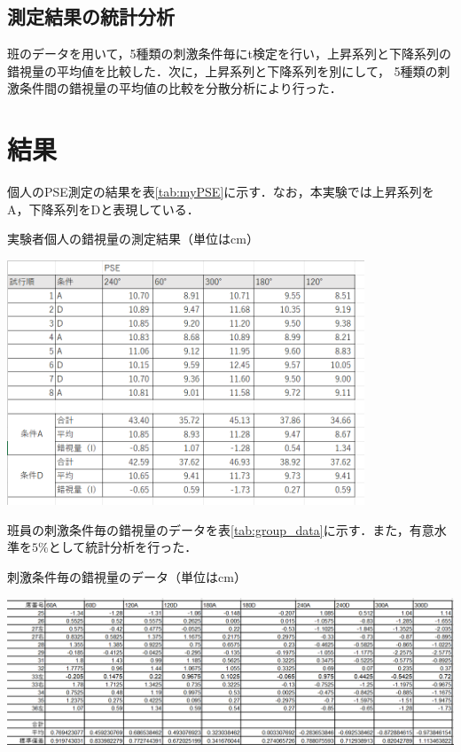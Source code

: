 \documentclass{jlreq}
\numberwithin{equation}{section}
\begin{document}
\subsection{測定結果の統計分析}
班のデータを用いて，5種類の刺激条件毎にt検定を行い，上昇系列と下降系列の錯視量の平均値を比較した．次に，上昇系列と下降系列を別にして，
5種類の刺激条件間の錯視量の平均値の比較を分散分析により行った．

\section{結果}
個人のPSE測定の結果を表\ref{tab:myPSE}に示す．なお，本実験では上昇系列をA，下降系列をDと表現している．

\begin{table}[H]
  \centering
  \caption{実験者個人の錯視量の測定結果（単位はcm）}
  \includegraphics[width=0.8\textwidth]{image/myPSE.png}
  \label{tab:myPSE}
\end{table}

班員の刺激条件毎の錯視量のデータを表\ref{tab:group_data}に示す．また，有意水準を$5\si{\percent}$として統計分析を行った．
\begin{table}[H]
  \centering
  \caption{刺激条件毎の錯視量のデータ（単位はcm）}
  \includegraphics[width=\textwidth]{image/錯視量_班員データ.png}
  \label{tab:group_data}
\end{table}
\end{document}
